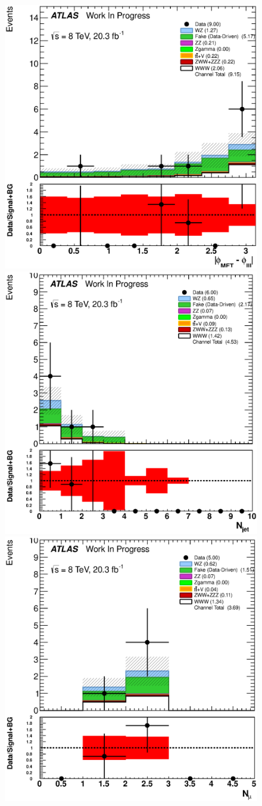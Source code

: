 \begin{figure}[ht!]
\includegraphics[width=0.3\columnwidth]{figures/appendix_signal_selection/Nov24Update_FakeSys_KFacSys_LinearY_Rebin/output/jobs/MxM/DataFull_Rates_May13_FakeRatesExactly2Loose_MuonMxMBJetGt0_ElBJetGt0SubtractPC_MxM/PreselectionNov23_15_0SFOS_ChargeAbs1_BVeto85_SFMllGt20_SSMeeZVeto15_physics/weight_all/eps/DeltaPhiMET123_Abs_histratio.eps}
\includegraphics[width=0.3\columnwidth]{figures/appendix_signal_selection/Nov24Update_FakeSys_KFacSys_LinearY_Rebin/output/jobs/MxM/DataFull_Rates_May13_FakeRatesExactly2Loose_MuonMxMBJetGt0_ElBJetGt0SubtractPC_MxM/PreselectionNov23_15_0SFOS_ChargeAbs1_BVeto85_SFMllGt20_SSMeeZVeto15_DeltaPhi2p5_physics/weight_all/eps/NJets_histratio.eps}
\includegraphics[width=0.3\columnwidth]{figures/appendix_signal_selection/Nov24Update_FakeSys_KFacSys_LinearY_Rebin/output/jobs/MxM/DataFull_Rates_May13_FakeRatesExactly2Loose_MuonMxMBJetGt0_ElBJetGt0SubtractPC_MxM/PreselectionNov23_15_0SFOS_ChargeAbs1_BVeto85_SFMllGt20_SSMeeZVeto15_DeltaPhi2p5_NJetLt2_physics/weight_all/eps/NMuons_histratio.eps}


\end{figure}
